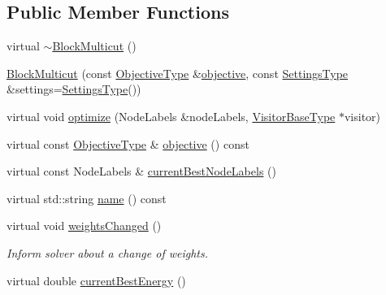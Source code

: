 \subsection*{Public Member Functions}
\begin{DoxyCompactItemize}
\item 
virtual \hyperlink{classnifty_1_1graph_1_1opt_1_1multicut_1_1BlockMulticut_a78c148a7743930f70440bd5fbc51746e}{$\sim$\+Block\+Multicut} ()
\item 
\hyperlink{classnifty_1_1graph_1_1opt_1_1multicut_1_1BlockMulticut_a587712c0de7e356c0e98296eff8552cb}{Block\+Multicut} (const \hyperlink{classnifty_1_1graph_1_1opt_1_1multicut_1_1BlockMulticut_a3a9ea9285ed606615a72dead69babd0a}{Objective\+Type} \&\hyperlink{classnifty_1_1graph_1_1opt_1_1multicut_1_1BlockMulticut_a88c479b394180da4220c855c35a1c230}{objective}, const \hyperlink{structnifty_1_1graph_1_1opt_1_1multicut_1_1BlockMulticut_1_1SettingsType}{Settings\+Type} \&settings=\hyperlink{structnifty_1_1graph_1_1opt_1_1multicut_1_1BlockMulticut_1_1SettingsType}{Settings\+Type}())
\item 
virtual void \hyperlink{classnifty_1_1graph_1_1opt_1_1multicut_1_1BlockMulticut_a29a5496f518f94ec2b7821a2a226c4bf}{optimize} (Node\+Labels \&node\+Labels, \hyperlink{classnifty_1_1graph_1_1opt_1_1multicut_1_1BlockMulticut_aa40e397b4bec33962317d71164d34c49}{Visitor\+Base\+Type} $\ast$visitor)
\item 
virtual const \hyperlink{classnifty_1_1graph_1_1opt_1_1multicut_1_1BlockMulticut_a3a9ea9285ed606615a72dead69babd0a}{Objective\+Type} \& \hyperlink{classnifty_1_1graph_1_1opt_1_1multicut_1_1BlockMulticut_a88c479b394180da4220c855c35a1c230}{objective} () const
\item 
virtual const Node\+Labels \& \hyperlink{classnifty_1_1graph_1_1opt_1_1multicut_1_1BlockMulticut_ae09c0ea657df934d97b7b192c82851f8}{current\+Best\+Node\+Labels} ()
\item 
virtual std\+::string \hyperlink{classnifty_1_1graph_1_1opt_1_1multicut_1_1BlockMulticut_aeac464d816f0b839bbbfcf9ab4238d06}{name} () const
\item 
virtual void \hyperlink{classnifty_1_1graph_1_1opt_1_1multicut_1_1BlockMulticut_a7646a6b7c8fe3b8e40ab6f72ab952081}{weights\+Changed} ()
\begin{DoxyCompactList}\small\item\em Inform solver about a change of weights. \end{DoxyCompactList}\item 
virtual double \hyperlink{classnifty_1_1graph_1_1opt_1_1multicut_1_1BlockMulticut_ae1dcff4732ce6e535f07916fc57565b2}{current\+Best\+Energy} ()
\end{DoxyCompactItemize}


